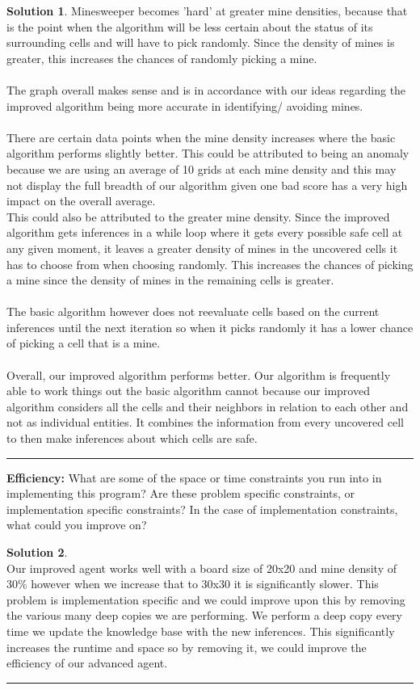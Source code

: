 \documentclass{article}
\theoremstyle{definition}
\def\fline{\rule{0.75\linewidth}{0.5pt}}
\newcommand{\finishline}{\vspace{-15pt}\begin{center}\fline\end{center}}
\newtheorem*{solution*}{Solution}
\newenvironment{solution}{\begin{solution*}}{{\finishline} \end{solution*}}
\begin{document}
\begin{solution}
    Minesweeper becomes 'hard' at greater mine densities, because that is the point when the algorithm will be less certain about the status of its surrounding cells and will have to pick randomly. Since the density of mines is greater, this increases the chances of randomly picking a mine. 
    \\\\
    The graph overall makes sense and is in accordance with our ideas regarding the improved algorithm being more accurate in identifying/ avoiding mines. 
    \\\\
    There are certain data points when the mine density increases where the basic algorithm performs slightly better. This could be attributed to being an anomaly because we are using an average of 10 grids at each mine density and this may not display the full breadth of our algorithm given one bad score has a very high impact on the overall average. \\
    This could also be attributed to the greater mine density. Since the improved algorithm gets inferences in a while loop where it gets every possible safe cell at any given moment, it leaves a greater density of mines in the uncovered cells it has to choose from when choosing randomly. This increases the chances of picking a mine since the density of mines in the remaining cells is greater. 
    \\\\
    The basic algorithm however does not reevaluate cells based on the current inferences until the next iteration so when it picks randomly it has a lower chance of picking a cell that is a mine.
    \\\\
    Overall, our improved algorithm performs better. Our algorithm is frequently able to work things out the basic algorithm cannot because our improved algorithm considers all the cells and their neighbors in relation to each other and not as individual entities. It combines the information from every uncovered cell to then make inferences about which cells are safe. 
	
\end{solution}
\smallskip

\textbf{Efficiency: }
What are some of the space or time constraints you run into in implementing this program? 
Are these problem specific constraints, or implementation specific constraints? 
In the case of implementation constraints, what could you improve on?
\begin{solution} \hfill \\
    Our improved agent works well with a board size of 20x20 and mine density of 30\% however when we increase that to 30x30 it is significantly slower.
    This problem is implementation specific and we could improve upon this by removing the various many deep copies we are performing. We perform a deep copy every time we update the knowledge base with the new inferences. This significantly increases the runtime and space so by removing it, we could improve the efficiency of our advanced agent.
\end{solution}
\end{document}
